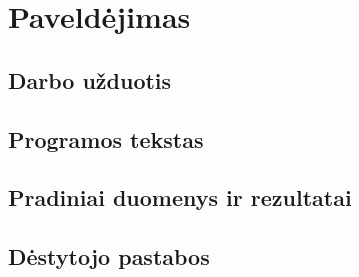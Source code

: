 \documentclass{article}
\begin{document}
\section{Paveldėjimas}
\subsection{Darbo užduotis}
\subsection{Programos tekstas}
\subsection{Pradiniai duomenys ir rezultatai}
\subsection{Dėstytojo pastabos}
\newpage
\end{document}
